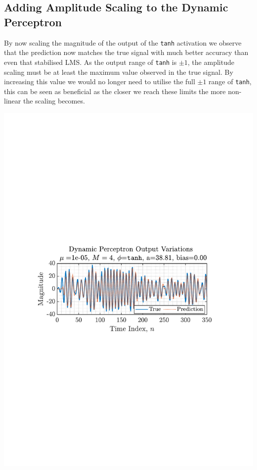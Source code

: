 \documentclass[12pt]{article}
\begin{document}
	\subsection{Adding Amplitude Scaling to the Dynamic Perceptron} \label{sec: 4-3-amplitude-dynamic-perc}
		\begin{minipage}[b]{0.49\textwidth}
			By now scaling the magnitude of the output of the \texttt{tanh} activation we observe that the prediction now matches the true signal with much better accuracy than even that stabilised LMS. As the output range of \texttt{tanh} is $\pm1$, the amplitude scaling must be at least the maximum value observed in the true signal. By increasing this value we would no longer need to utilise the full $\pm1$ range of \texttt{tanh}, this can be seen as beneficial as the closer we reach these limits the more non-linear the scaling becomes.
		\end{minipage}%
		\begin{minipage}{0.04\textwidth}
			\hspace*{0.04\textwidth}
		\end{minipage}%
		\begin{minipage}[b]{0.49\textwidth}
			\centering
			\includegraphics[trim={2.2cm 11.2cm 3.15cm  11.2cm}, clip, width=\textwidth]{../MATLAB/figures/q4_3_fig01.pdf} 
			\captionsetup{justification=centering}
			\label{fig: 4-3}
		\end{minipage}%
	
\end{document}
